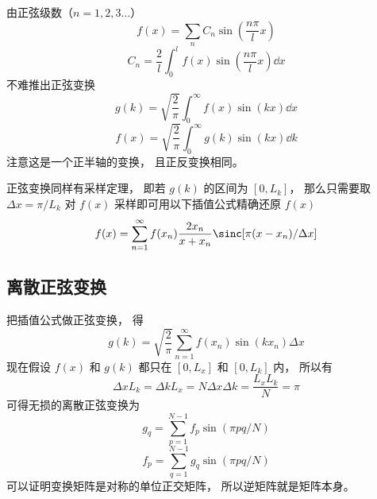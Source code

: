 

由正弦级数（$n = 1, 2, 3\dots$）
\begin{equation}
f(x) = \sum_n C_n \sin(\frac{n\pi}{l}x)
\end{equation}
\begin{equation}
C_n =  \frac2l \int_0^l f(x) \sin(\frac{n\pi}{l}x) \dd{x}
\end{equation}
不难推出正弦变换
\begin{equation}
g(k) = \sqrt{\frac{2}{\pi}} \int_0^{\infty} f(x) \sin(kx) \dd{x}
\end{equation}
\begin{equation}
f(x) = \sqrt{\frac{2}{\pi}} \int_0^{\infty} g(k) \sin(kx) \dd{k}
\end{equation}
注意这是一个正半轴的变换， 且正反变换相同。

正弦变换同样有采样定理， 即若 $g(k)$ 的区间为 $[0, L_k]$， 那么只需要取 $\Delta x = \pi/L_k$ 对 $f(x)$ 采样即可用以下插值公式精确还原 $f(x)$
\begin{equation}
f(x) = \sum_{n=1}^\infty f(x_n)\frac{2x_n}{x+x_n}\sinc[\pi(x-x_n)/\Delta x]
\end{equation} 

\subsection{离散正弦变换}
把插值公式做正弦变换， 得
\begin{equation}
g(k) = \sqrt{\frac{2}{\pi}} \sum_{n=1}^\infty f(x_n) \sin(k x_n) \Delta x
\end{equation}
现在假设 $f(x)$ 和 $g(k)$ 都只在 $[0, L_x]$ 和 $[0, L_k]$ 内， 所以有
\begin{equation}
\Delta x L_k = \Delta k L_x = N\Delta x\Delta k = \frac{L_xL_k}{N} = \pi
\end{equation}
可得无损的离散正弦变换为
\begin{equation}
g_q = \sum_{p = 1}^{N-1} f_p \sin(\pi pq/N)
\end{equation}
\begin{equation}
f_p = \sum_{q = 1}^{N-1} g_q \sin(\pi pq/N)
\end{equation}
可以证明变换矩阵是对称的单位正交矩阵， 所以逆矩阵就是矩阵本身。
